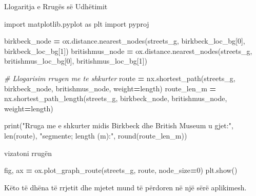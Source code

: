 \documentclass[
  ignorenonframetext,
]{beamer}
\newenvironment{Shaded}{\begin{snugshade}}{\end{snugshade}}
\newcommand{\BuiltInTok}[1]{#1}
\newcommand{\CommentTok}[1]{\textcolor[rgb]{0.56,0.35,0.01}{\textit{#1}}}
\newcommand{\DecValTok}[1]{\textcolor[rgb]{0.00,0.00,0.81}{#1}}
\newcommand{\ImportTok}[1]{#1}
\newcommand{\NormalTok}[1]{#1}
\newcommand{\OperatorTok}[1]{\textcolor[rgb]{0.81,0.36,0.00}{\textbf{#1}}}
\newcommand{\StringTok}[1]{\textcolor[rgb]{0.31,0.60,0.02}{#1}}
\begin{document}
\begin{frame}[fragile]{Llogaritja e Rrugës së Udhëtimit}
\protect\hypertarget{llogaritja-e-rruguxebs-suxeb-udhuxebtimit-1}{}

\begin{Shaded}
\begin{Highlighting}[]
\ImportTok{import}\NormalTok{ matplotlib.pyplot }\ImportTok{as}\NormalTok{ plt}
\ImportTok{import}\NormalTok{ pyproj}

\NormalTok{birkbeck\_node }\OperatorTok{=}\NormalTok{ ox.distance.nearest\_nodes(streets\_g, birkbeck\_loc\_bg[}\DecValTok{0}\NormalTok{], birkbeck\_loc\_bg[}\DecValTok{1}\NormalTok{])}
\NormalTok{britishmus\_node }\OperatorTok{=}\NormalTok{ ox.distance.nearest\_nodes(streets\_g, britishmus\_loc\_bg[}\DecValTok{0}\NormalTok{], britishmus\_loc\_bg[}\DecValTok{1}\NormalTok{])}

\CommentTok{\# Llogarisim rrugen me te shkurter}
\NormalTok{route }\OperatorTok{=}\NormalTok{ nx.shortest\_path(streets\_g, birkbeck\_node, britishmus\_node, weight}\OperatorTok{=}\StringTok{\textquotesingle{}length\textquotesingle{}}\NormalTok{)}
\NormalTok{route\_len\_m }\OperatorTok{=}\NormalTok{ nx.shortest\_path\_length(streets\_g, birkbeck\_node, britishmus\_node, weight}\OperatorTok{=}\StringTok{\textquotesingle{}length\textquotesingle{}}\NormalTok{)}

\BuiltInTok{print}\NormalTok{(}\StringTok{"Rruga me e shkurter midis Birkbeck dhe British Museum u gjet:"}\NormalTok{,}
\BuiltInTok{len}\NormalTok{(route), }\StringTok{"segmente; length (m):"}\NormalTok{, }\BuiltInTok{round}\NormalTok{(route\_len\_m))}
\end{Highlighting}
\end{Shaded}
\end{frame}

\begin{frame}[fragile]{vizatoni rrugën}
\protect\hypertarget{vizatoni-rruguxebn}{}

\begin{Shaded}
\begin{Highlighting}[]
\NormalTok{fig, ax }\OperatorTok{=}\NormalTok{ ox.plot\_graph\_route(streets\_g, route, node\_size}\OperatorTok{=}\DecValTok{0}\NormalTok{)}
\NormalTok{plt.show()}
\end{Highlighting}
\end{Shaded}

Këto të dhëna të rrjetit dhe mjetet mund të përdoren në një sërë
aplikimesh.
\end{frame}
\end{document}
